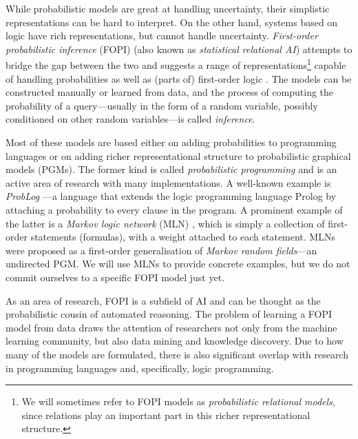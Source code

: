 \documentclass[11pt,english,twocolumn]{article}
\begin{document}
While probabilistic models are great at handling uncertainty, their
simplistic representations can be hard to interpret. On the other hand, systems
based on logic have rich representations, but cannot handle uncertainty.
\emph{First-order probabilistic inference} (FOPI) (also known as
\emph{statistical relational AI}) attempts to bridge the gap
between the two and suggests a range of representations\footnote{ We will
  sometimes refer to FOPI models as \emph{probabilistic relational models},
  since relations play an important part in this richer representational
  structure.} capable of handling probabilities as well as (parts of)
first-order logic \cite{DBLP:series/sci/BrazAR08}. The models can be constructed
manually or learned from data, and the process of computing the probability of a
query---usually in the form of a random variable, possibly conditioned on other
random variables---is called \emph{inference}.

Most of these models are based either on adding probabilities to programming
languages or on adding richer representational structure to probabilistic
graphical models (PGMs). The former kind is called \emph{probabilistic
  programming} \cite{DBLP:conf/icse/GordonHNR14} and is an active area of
research with many implementations. A well-known example is \emph{ProbLog}
\cite{DBLP:conf/ijcai/RaedtKT07}---a language that extends the logic programming
language Prolog by attaching a probability to every clause in the program. A
prominent example of the latter is a \emph{Markov logic network} (MLN)
\cite{DBLP:journals/ml/RichardsonD06}, which is simply a collection of
first-order statements (formulas), with a weight attached to each statement.
MLNs were proposed as a first-order generalisation of \emph{Markov random
  fields}---an undirected PGM. We will use MLNs to provide concrete examples,
but we do not commit ourselves to a specific FOPI model just yet.

As an area of research, FOPI is a subfield of AI and can be thought as the
probabilistic cousin of automated reasoning. The problem of learning a FOPI
model from data draws the attention of researchers not only from the machine
learning community, but also data mining and knowledge discovery. Due to how
many of the models are formulated, there is also significant overlap with
research in programming languages and, specifically, logic programming.
\end{document}
